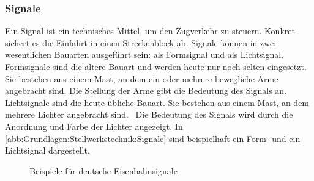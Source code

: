 \subsubsection*{Signale}\label{text:Grundlagen:Stellwerkstechnik:Sicherung-des-Schienenverkehrs:Signale}

Ein Signal ist ein technisches Mittel, um den Zugverkehr zu steuern. Konkret sichert es die Einfahrt in einen Streckenblock ab. Signale können in zwei wesentlichen Bauarten ausgeführt sein: als Formsignal und als Lichtsignal. Formsignale sind die ältere Bauart und werden heute nur noch selten eingesetzt. Sie bestehen aus einem Mast, an dem ein oder mehrere bewegliche Arme angebracht sind. Die Stellung der Arme gibt die Bedeutung des Signals an. Lichtsignale sind die heute übliche Bauart. Sie bestehen aus einem Mast, an dem mehrere Lichter angebracht sind.~\cite[][S.78 ff.]{bib:Sicherung-des-Schienenverkehrs} Die Bedeutung des Signals wird durch die Anordnung und Farbe der Lichter angezeigt. In \autoref{abb:Grundlagen:Stellwerkstechnik:Signale} sind beispielhaft ein Form- und ein Lichtsignal dargestellt.

\begin{figure}[H]
    \centering
    \qquad
    \caption{Beispiele für deutsche Eisenbahnsignale}\label{abb:Grundlagen:Stellwerkstechnik:Signale}
\end{figure}


